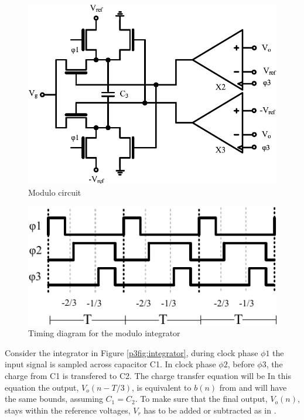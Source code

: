 \begin{figure}[ht]
\centering 
 \includegraphics[width=\myfigwidth]{graphics/moddetector}
  \caption{Modulo circuit}
  \label{p3fig:moddetector}
\end{figure}

\begin{figure}[ht]
\centering 
 \includegraphics[width=\myfigwidth]{graphics/timing}
  \caption{Timing diagram for the modulo integrator}
  \label{p3fig:timing}
\end{figure}

Consider the integrator in Figure \ref{p3fig:integrator}, during clock phase $\phi 1$ the
input signal is sampled across capacitor C1. In clock phase $\phi
2$, before $\phi 3$, the charge from C1 is transfered to C2. The charge transfer
equation will be 
In this equation the output, $V_o(n-T/3)$, is equivalent to
$ b(n)$ from  and will have the same bounds, assuming $C_1 = C_2$. To make sure that the final
output, $V_o(n)$, stays within the reference voltages, $V_r$ has to be
added or subtracted as in .

